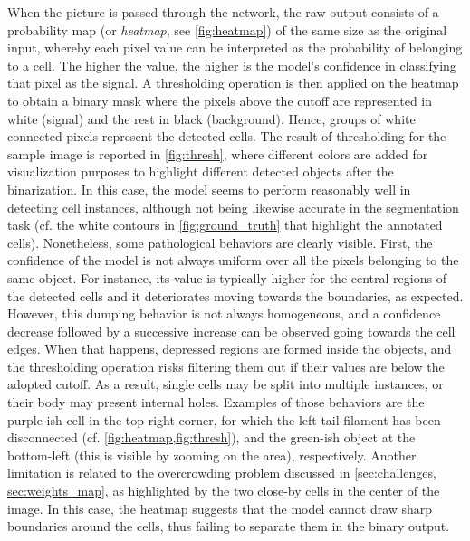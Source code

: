 When the picture is passed through the network, the raw output consists of a probability map (or \textit{heatmap}, see \cref{fig:heatmap}) of the same size as the original input, whereby each pixel value can be interpreted as the probability of belonging to a cell. 
The higher the value, the higher is the model's confidence in classifying that pixel as the signal. 
A thresholding operation is then applied on the heatmap to obtain a binary mask where the pixels above the cutoff are represented in white (signal) and the rest in black (background).
Hence, groups of white connected pixels represent the detected cells. 
The result of thresholding for the sample image is reported in \cref{fig:thresh}, where different colors are added for visualization purposes to highlight different detected objects after the binarization.
In this case, the model seems to perform reasonably well in detecting cell instances, although not being likewise accurate in the segmentation task (cf. the white contours in \cref{fig:ground_truth} that highlight the annotated cells).
Nonetheless, some pathological behaviors are clearly visible.
First, the confidence of the model is not always uniform over all the pixels belonging to the same object.
For instance, its value is typically higher for the central regions of the detected cells and it deteriorates moving towards the boundaries, as expected.
However, this dumping behavior is not always homogeneous, and a confidence decrease followed by a successive increase can be observed going towards the cell edges.
When that happens, depressed regions are formed inside the objects, and the thresholding operation risks filtering them out if their values are below the adopted cutoff.
As a result, single cells may be split into multiple instances, or their body may present internal holes.
Examples of those behaviors are the purple-ish cell in the top-right corner, for which the left tail filament has been disconnected (cf. \cref{fig:heatmap,fig:thresh}), and the green-ish object at the bottom-left (this is visible by zooming on the area), respectively.
Another limitation is related to the overcrowding problem discussed in \cref{sec:challenges, sec:weights_map}, as highlighted by the two close-by cells in the center of the image.
In this case, the heatmap suggests that the model cannot draw sharp boundaries around the cells, thus failing to separate them in the binary output. 

